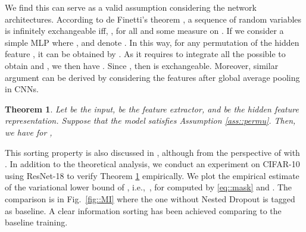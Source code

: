 \documentclass[journal]{IEEEtran}
\newtheorem{theorem}{Theorem}
\begin{document}
We find this can serve as a valid assumption considering the network architectures.
According to de Finetti's theorem \cite{heath1976finetti}, a sequence of random variables  is infinitely exchangeable iff,
, for all  and some measure  on .
If we consider a simple MLP where ,  and denote .
In this way, for any permutation of the hidden feature , it can be obtained by .
As it requires to integrate all the possible  to obtain  and ,
we then have .
Since , then  is exchangeable.
Moreover, similar argument can be derived by considering the features after global average pooling in CNNs.


\begin{theorem}  \label{thm::ranking}
    Let  be the input,  be the feature extractor, and  be the hidden feature representation.
    Suppose that the model satisfies Assumption \ref{ass::permu}.
    Then, we have for ,
    
\end{theorem}

This sorting property is also discussed in \cite{rippel2014learning}, although from the perspective of  with .
In addition to the theoretical analysis, we conduct an experiment on CIFAR-10 \cite{krizhevsky2009learning} using ResNet-18 to verify Theorem \ref{thm::ranking} empirically. 
We plot the empirical estimate of the variational lower bound of , i.e.,~, for  computed by \eqref{eq::mask} and . 
The comparison is in Fig.~\ref{fig::MI} where the one without Nested Dropout is tagged as baseline. 
A clear information sorting has been achieved comparing to the baseline training. 
\end{document}
